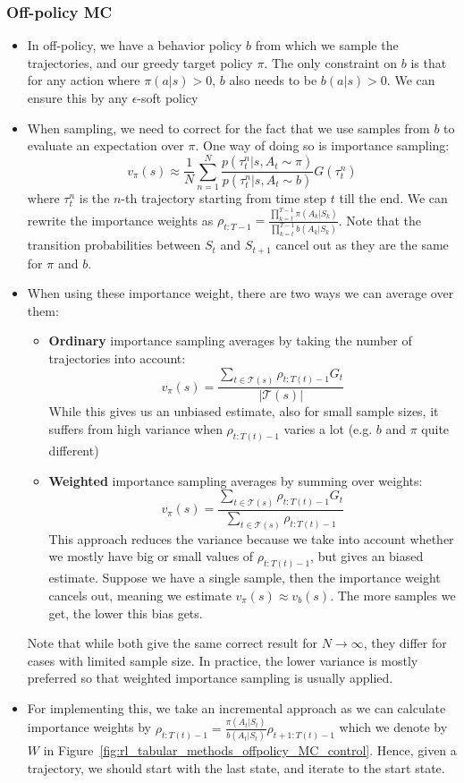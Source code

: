 \subsubsection{Off-policy MC}
\begin{itemize}
	\item In off-policy, we have a behavior policy $b$ from which we sample the trajectories, and our greedy target policy $\pi$. The only constraint on $b$ is that for any action where $\pi(a|s)>0$, $b$ also needs to be $b(a|s)>0$. We can ensure this by any $\epsilon$-soft policy
	\item When sampling, we need to correct for the fact that we use samples from $b$ to evaluate an expectation over $\pi$. One way of doing so is importance sampling:
	$$v_{\pi}(s) \approx \frac{1}{N}\sum_{n=1}^{N} \frac{p(\tau^{n}_{t}|s,A_t\sim\pi)}{p(\tau^{n}_{t}|s,A_t\sim b)} G(\tau_{t}^{n})$$
	where $\tau^{n}_{t}$ is the $n$-th trajectory starting from time step $t$ till the end. We can rewrite the importance weights as $\rho_{t:T-1}=\frac{\prod_{k=t}^{T-1}\pi(A_k|S_k)}{\prod_{k=t}^{T-1}b(A_k|S_k)}$. Note that the transition probabilities between $S_{t}$ and $S_{t+1}$ cancel out as they are the same for $\pi$ and $b$.
	\item When using these importance weight, there are two ways we can average over them:
	\begin{itemize}
		\item \textbf{Ordinary} importance sampling averages by taking the number of trajectories into account:
		$$v_{\pi}(s)=\frac{\sum_{t\in\mathcal{T}(s)}\rho_{t:T(t)-1}G_t}{|\mathcal{T}(s)|}$$
		While this gives us an unbiased estimate, also for small sample sizes, it suffers from high variance when $\rho_{t:T(t)-1}$ varies a lot (e.g. $b$ and $\pi$ quite different)
		\item \textbf{Weighted} importance sampling averages by summing over weights:
		$$v_{\pi}(s)=\frac{\sum_{t\in\mathcal{T}(s)}\rho_{t:T(t)-1}G_t}{\sum_{t\in\mathcal{T}(s)}\rho_{t:T(t)-1}}$$
		This approach reduces the variance because we take into account whether we mostly have big or small values of $\rho_{t:T(t)-1}$, but gives an biased estimate. Suppose we have a single sample, then the importance weight cancels out, meaning we estimate $v_{\pi}(s)\approx v_{b}(s)$. The more samples we get, the lower this bias gets.
	\end{itemize}
	Note that while both give the same correct result for $N\to\infty$, they differ for cases with limited sample size. In practice, the lower variance is mostly preferred so that weighted importance sampling is usually applied.
	\item For implementing this, we take an incremental approach as we can calculate importance weights by $\rho_{t:T(t)-1}=\frac{\pi(A_t|S_t)}{b(A_t|S_t)}\rho_{t+1:T(t)-1}$ which we denote by $W$ in Figure~\ref{fig:rl_tabular_methods_offpolicy_MC_control}. Hence, given a trajectory, we should start with the last state, and iterate to the start state.
	

\end{itemize}
